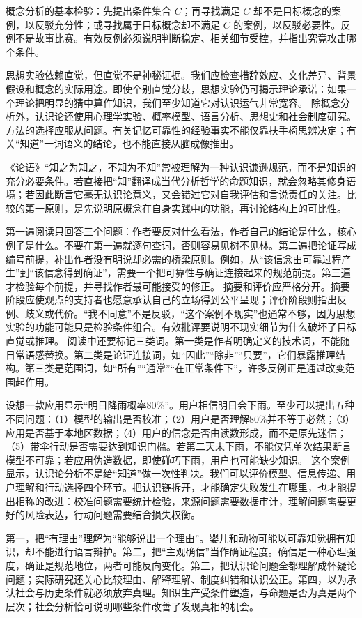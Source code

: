 \begin{argumentbox}
概念分析的基本检验：先提出条件集合 $C$；再寻找满足 $C$ 却不是目标概念的案例，以反驳充分性；或寻找属于目标概念却不满足 $C$ 的案例，以反驳必要性。反例不是故事比赛。有效反例必须说明判断稳定、相关细节受控，并指出究竟攻击哪个条件。
\end{argumentbox}

思想实验依赖直觉，但直觉不是神秘证据。我们应检查措辞效应、文化差异、背景假设和概念的实际用途。即使个别直觉分歧，思想实验仍可揭示理论承诺：如果一个理论把明显的猜中算作知识，我们至少知道它对认识运气非常宽容。 除概念分析外，认识论还使用心理学实验、概率模型、语言分析、思想史和社会制度研究。方法的选择应服从问题。有关记忆可靠性的经验事实不能仅靠扶手椅思辨决定；有关“知道”一词语义的结论，也不能直接从脑成像推出。

\begin{comparison}
《论语》“知之为知之，不知为不知”常被理解为一种认识谦逊规范，而不是知识的充分必要条件\parencite[2.17]{analects2003}。若直接把“知”翻译成当代分析哲学的命题知识，就会忽略其修身语境；若因此断言它毫无认识论意义，又会错过它对自我评估和言说责任的关注。比较的第一原则，是先说明原概念在自身实践中的功能，再讨论结构上的可比性。
\end{comparison}

第一遍阅读只回答三个问题：作者要反对什么看法，作者自己的结论是什么，核心例子是什么。不要在第一遍就逐句查词，否则容易见树不见林。第二遍把论证写成编号前提，补出作者没有明说却必需的桥梁原则。例如，从“该信念由可靠过程产生”到“该信念得到确证”，需要一个把可靠性与确证连接起来的规范前提。第三遍才检验每个前提，并寻找作者最可能接受的修正。 摘要和评价应严格分开。摘要阶段应使观点的支持者也愿意承认自己的立场得到公平呈现；评价阶段则指出反例、歧义或代价。“我不同意”不是反驳，“这个案例不现实”也通常不够，因为思想实验的功能可能只是检验条件组合。有效批评要说明不现实细节为什么破坏了目标直觉或推理。 阅读中还要标记三类词。第一类是作者明确定义的技术词，不能随日常语感替换。第二类是论证连接词，如“因此”“除非”“只要”，它们暴露推理结构。第三类是范围词，如“所有”“通常”“在正常条件下”，许多反例正是通过改变范围起作用。

设想一款应用显示“明日降雨概率80\%”。用户相信明日会下雨。至少可以提出五种不同问题：（1）模型的输出是否校准；（2）用户是否理解80\%并不等于必然；（3）应用是否基于本地区数据；（4）用户的信念是否由读数形成，而不是原先迷信；（5）带伞行动是否需要达到知识门槛。若第二天未下雨，不能仅凭单次结果断言模型不可靠；若应用伪造数据，即使碰巧下雨，用户也可能缺少知识。 这个案例显示，认识论分析不是给“知道”做一次性判决。我们可以评价模型、信息传递、用户理解和行动选择四个环节。把认识链拆开，才能确定失败发生在哪里，也才能提出相称的改进：校准问题需要统计检验，来源问题需要数据审计，理解问题需要更好的风险表达，行动问题需要结合损失权衡。

第一，把“有理由”理解为“能够说出一个理由”。婴儿和动物可能以可靠知觉拥有知识，却不能进行语言辩护。第二，把“主观确信”当作确证程度。确信是一种心理强度，确证是规范地位，两者可能反向变化。第三，把认识论问题全都理解成怀疑论问题；实际研究还关心比较理由、解释理解、制度纠错和认识公正。第四，以为承认社会与历史条件就必须放弃真理。知识生产受条件塑造，与命题是否为真是两个层次；社会分析恰可说明哪些条件改善了发现真相的机会。
